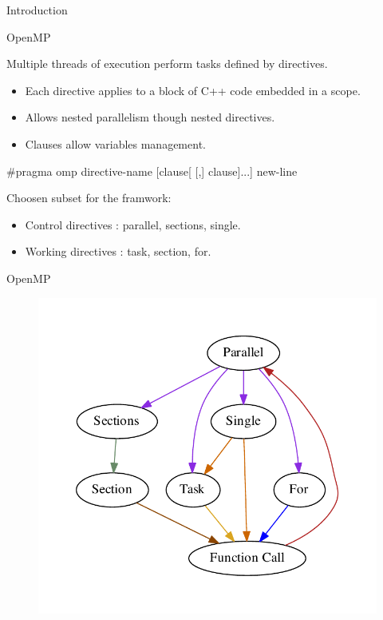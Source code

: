 \documentclass[xcolor=dvipsnames]{beamer}
\begin{document}
\begin{section}{Introduction}
\begin{frame}{\hskip 0.3cm OpenMP }

Multiple threads of execution perform tasks defined by directives.

\begin{itemize}
\item Each directive applies to  a block of C++ code embedded in a scope.

\item Allows nested parallelism though nested directives.

\item Clauses allow variables management.
\end{itemize}

\begin{block}

$\#$pragma omp directive-name [clause[ [,] clause]...] new-line

\end{block}

Choosen subset for the framwork:

\begin{itemize}

\item Control directives : parallel, sections, single.

\item Working directives : task, section, for.

\end{itemize}

\end{frame}










\begin{frame}{\hskip 0.3cm OpenMP}

\begin{figure}
\centering
\includegraphics[scale = 0.45]{ompstructure}


\end{figure}
\end{frame}
\end{section}
\end{document}
